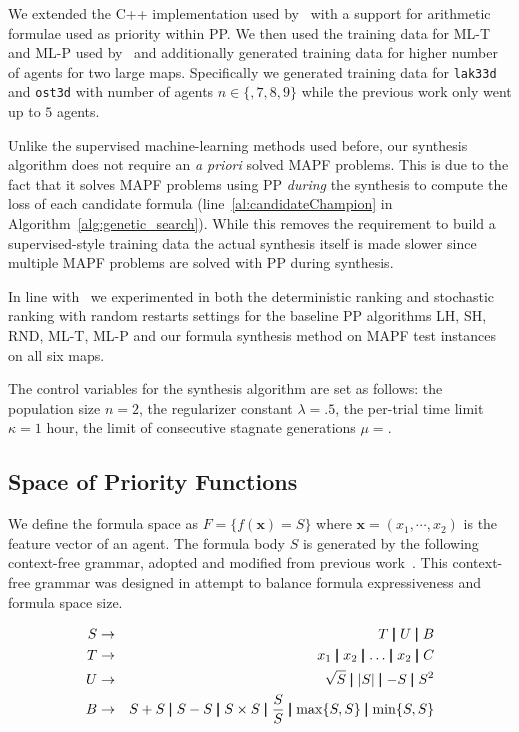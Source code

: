 \documentclass[letterpaper]{article} %
\newcommand{\midb}{\pmb{\mid}}
\newcommand{\bea}{\begin{eqnarray}}
\newcommand{\eea}{\end{eqnarray}}
\renewcommand{\max}{\operatornamewithlimits{max}\limits}
\begin{document}
We extended the C++ implementation used by~\citet{zhang222learning} with a support for arithmetic formulae used as priority within PP. We then used the training data for ML-T and ML-P used by~\citet{zhang222learning} and additionally generated training data for higher number of agents for two large maps. Specifically we generated training data for {\tt lak33d} and {\tt ost3d} with number of agents $ n \in \{, 7, 8, 9\} $ while the previous work only went up to $ 5 $ agents.

Unlike the supervised machine-learning methods used before, our synthesis algorithm does not require an \textit{a priori} solved MAPF problems. This is due to the fact that it solves MAPF problems using PP {\em during} the synthesis to compute the loss of each candidate formula (line~\ref{al:candidateChampion} in Algorithm~\ref{alg:genetic_search}). While this removes the requirement to build a supervised-style training data the actual synthesis itself is made slower since multiple MAPF problems are solved with PP during synthesis.

In line with~\citet{zhang222learning} we experimented in both the deterministic ranking and stochastic ranking with random restarts settings for the baseline PP algorithms LH, SH, RND, ML-T, ML-P and our formula synthesis method on MAPF test instances on all six maps.

The control variables for the synthesis algorithm are set as follows: the population size $ n = 2 $, the regularizer constant $ \lambda = .5 $, the per-trial time limit $ \kappa = 1 $ hour, the limit of consecutive stagnate generations $ \mu =  $.



\subsection{Space of Priority Functions}
\label{sec:synthesisSpaceP}

We define the formula space as $ F = \{f(\mathbf{x}) = S\} $ where $ \mathbf{x} = (x_1, \cdots, x_{2}) $ is the feature vector of an agent. The formula body $ S $ is generated by the following context-free grammar, adopted and modified from previous work~\citet{bulitko222portability}. This context-free grammar was designed in attempt to balance formula expressiveness and formula space size.

{\small\bea
S &\to& T \midb U \midb B \nonumber \\
T &\to& x_1 \midb x_2 \midb \dots \midb x_{2} \midb C \nonumber  \\
U &\to& \sqrt{S} \midb |S| \midb -S \midb S^2 \nonumber \\
B &\to& S+S \midb S-S \midb S \times S \midb \frac{S}{S} \midb \max\{S,S\} \midb \min\{S,S\} \nonumber
\eea}
\end{document}
